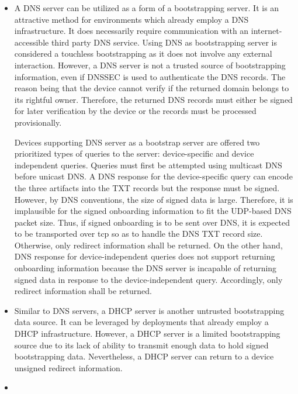 \begin{itemize}

\item
A DNS server can be utilized as a form of a bootstrapping server. It is an attractive method for environments which already employ a DNS infrastructure. It does necessarily require communication with an internet-accessible third party DNS service. Using DNS as bootstrapping server is considered a touchless bootstrapping as it does not involve any external interaction. However, a DNS server is not a trusted source of bootstrapping information, even if DNSSEC \cite{dnssec} is used to authenticate the DNS records. The reason being that the device cannot verify if the returned domain belongs to its rightful owner. Therefore, the returned DNS records must either be signed for later verification by the device or the records must be processed provisionally.
\par
Devices supporting DNS server as a bootstrap server are offered two prioritized types of queries to the server: device-specific and device independent queries. Queries must first be attempted using multicast DNS before unicast DNS. A DNS response for the device-specific query can encode the three artifacts into the TXT records but the response must be signed. However, by DNS conventions, the size of signed data is large. Therefore, it is implausible for the signed onboarding information to fit the UDP-based DNS packet size. Thus, if signed onboarding is to be sent over DNS, it is expected to be transported over \gls{tcp} so as to handle the DNS TXT record size. Otherwise, only redirect information shall be returned. On the other hand, DNS response for device-independent queries does not support returning onboarding information because the DNS server is incapable of returning signed data in response to the device-independent query. Accordingly, only redirect information shall be returned.
\item
Similar to DNS servers, a DHCP server is another untrusted bootstrapping data source. It can be leveraged by deployments that already employ a DHCP infrastructure. However, a DHCP server is a limited bootstrapping source due to its lack of ability to transmit enough data to hold signed bootstrapping data. Nevertheless, a DHCP server can return to a device unsigned redirect information.
\item

\end{itemize}
